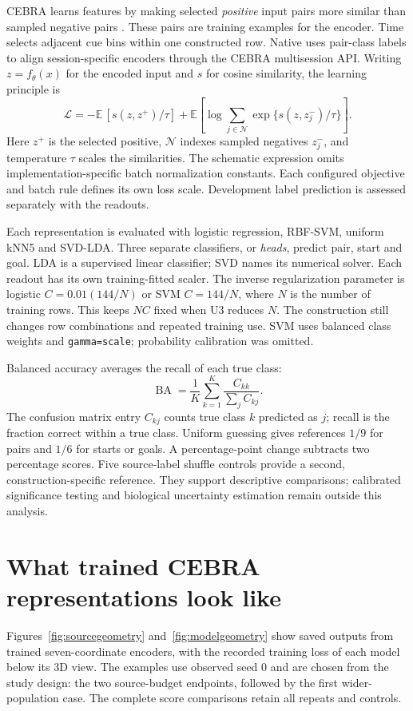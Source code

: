 \documentclass[10pt,a4paper]{article}
\newcommand{\BA}{\operatorname{BA}}
\begin{document}
CEBRA learns features by making selected \emph{positive} input pairs more similar than sampled negative pairs \cite{cebra}. These pairs are training examples for the encoder. Time selects adjacent cue bins within one constructed row. Native uses pair-class labels to align session-specific encoders through the CEBRA multisession API. Writing $z=f_\theta(x)$ for the encoded input and $s$ for cosine similarity, the learning principle is
\begin{equation}
 \mathcal L=-\mathbb E\,[s(z,z^+)/\tau]
 +\mathbb E\left[\log\!\sum_{j\in\mathcal N}\exp\{s(z,z_j^-)/\tau\}\right].
\end{equation}
Here $z^+$ is the selected positive, $\mathcal N$ indexes sampled negatives $z_j^-$, and temperature $\tau$ scales the similarities. The schematic expression omits implementation-specific batch normalization constants. Each configured objective and batch rule defines its own loss scale. Development label prediction is assessed separately with the readouts.

Each representation is evaluated with logistic regression, RBF-SVM, uniform kNN5 and SVD-LDA. Three separate classifiers, or \emph{heads}, predict pair, start and goal. LDA is a supervised linear classifier; SVD names its numerical solver. Each readout has its own training-fitted scaler. The inverse regularization parameter is logistic $C=0.01(144/N)$ or SVM $C=144/N$, where $N$ is the number of training rows. This keeps $NC$ fixed when U3 reduces $N$. The construction still changes row combinations and repeated training use. SVM uses balanced class weights and \texttt{gamma=scale}; probability calibration was omitted.

Balanced accuracy averages the recall of each true class:
\begin{equation}
\BA=\frac1K\sum_{k=1}^K\frac{C_{kk}}{\sum_j C_{kj}}.
\end{equation}
The confusion matrix entry $C_{kj}$ counts true class $k$ predicted as $j$; recall is the fraction correct within a true class. Uniform guessing gives references $1/9$ for pairs and $1/6$ for starts or goals. A percentage-point change subtracts two percentage scores. Five source-label shuffle controls provide a second, construction-specific reference. They support descriptive comparisons; calibrated significance testing and biological uncertainty estimation remain outside this analysis.

\clearpage
\section{What trained CEBRA representations look like}\label{sec:geometry}
Figures~\ref{fig:sourcegeometry} and~\ref{fig:modelgeometry} show saved outputs from trained seven-coordinate encoders, with the recorded training loss of each model below its 3D view. The examples use observed seed 0 and are chosen from the study design: the two source-budget endpoints, followed by the first wider-population case. The complete score comparisons retain all repeats and controls.
\end{document}
